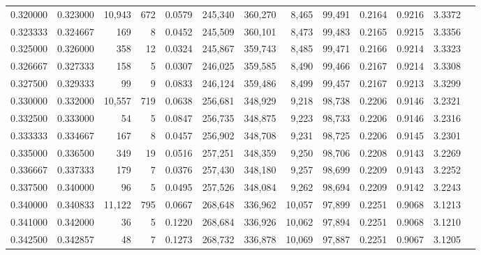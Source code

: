 \begin{tabular}{rrrrrrrrrrrrr}
0.320000 & 0.323000 & 10,943 &   672 &                                     0.0579 & 245,340 & 360,270 &   8,465 &  99,491 & 0.2164 & 0.9216 & 3.3372 \\
0.323333 & 0.324667 &    169 &     8 &                                     0.0452 & 245,509 & 360,101 &   8,473 &  99,483 & 0.2165 & 0.9215 & 3.3356 \\
0.325000 & 0.326000 &    358 &    12 &                                     0.0324 & 245,867 & 359,743 &   8,485 &  99,471 & 0.2166 & 0.9214 & 3.3323 \\
0.326667 & 0.327333 &    158 &     5 &                                     0.0307 & 246,025 & 359,585 &   8,490 &  99,466 & 0.2167 & 0.9214 & 3.3308 \\
0.327500 & 0.329333 &     99 &     9 &                                     0.0833 & 246,124 & 359,486 &   8,499 &  99,457 & 0.2167 & 0.9213 & 3.3299 \\
0.330000 & 0.332000 & 10,557 &   719 &                                     0.0638 & 256,681 & 348,929 &   9,218 &  98,738 & 0.2206 & 0.9146 & 3.2321 \\
0.332500 & 0.333000 &     54 &     5 &                                     0.0847 & 256,735 & 348,875 &   9,223 &  98,733 & 0.2206 & 0.9146 & 3.2316 \\
0.333333 & 0.334667 &    167 &     8 &                                     0.0457 & 256,902 & 348,708 &   9,231 &  98,725 & 0.2206 & 0.9145 & 3.2301 \\
0.335000 & 0.336500 &    349 &    19 &                                     0.0516 & 257,251 & 348,359 &   9,250 &  98,706 & 0.2208 & 0.9143 & 3.2269 \\
0.336667 & 0.337333 &    179 &     7 &                                     0.0376 & 257,430 & 348,180 &   9,257 &  98,699 & 0.2209 & 0.9143 & 3.2252 \\
0.337500 & 0.340000 &     96 &     5 &                                     0.0495 & 257,526 & 348,084 &   9,262 &  98,694 & 0.2209 & 0.9142 & 3.2243 \\
0.340000 & 0.340833 & 11,122 &   795 &                                     0.0667 & 268,648 & 336,962 &  10,057 &  97,899 & 0.2251 & 0.9068 & 3.1213 \\
0.341000 & 0.342000 &     36 &     5 &                                     0.1220 & 268,684 & 336,926 &  10,062 &  97,894 & 0.2251 & 0.9068 & 3.1210 \\
0.342500 & 0.342857 &     48 &     7 &                                     0.1273 & 268,732 & 336,878 &  10,069 &  97,887 & 0.2251 & 0.9067 & 3.1205 \\

\end{tabular}
